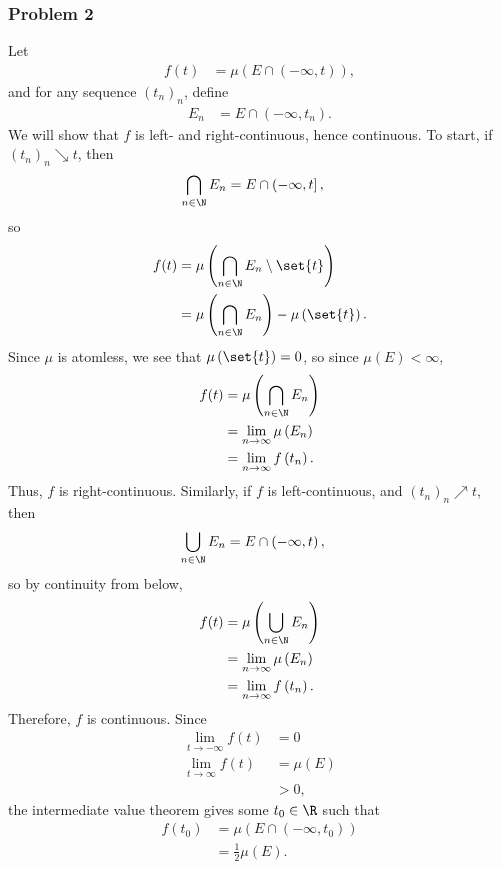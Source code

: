 \documentclass[10pt]{mypackage}
\begin{document}
\subsubsection{Problem 2}%
Let
\begin{align*}
  f(t) &= \mu\left( E\cap \left( -\infty,t \right) \right),
\end{align*}
and for any sequence $\left( t_n \right)_n$, define
\begin{align*}
  E_n &= E\cap \left( -\infty,t_n \right).
\end{align*}
We will show that $f$ is left- and right-continuous, hence continuous. To start, if $\left( t_n \right)_n\searrow t$, then
\begin{align*}
  \bigcap_{n\in \N} E_n &= E\cap \left( -\infty,t \right],
\end{align*}
so
\begin{align*}
  f(t) &= \mu\left( \bigcap_{n\in \N} E_n\setminus \set{t} \right)\\
       &= \mu\left( \bigcap_{n\in \N} E_n \right) -\mu\left( \set{t} \right).
\end{align*}
Since $\mu$ is atomless, we see that $\mu\left( \set{t} \right) = 0$, so since $\mu\left( E \right) < \infty$,
\begin{align*}
  f(t) &= \mu\left( \bigcap_{n\in\N} E_n \right)\\
       &= \lim_{n\rightarrow\infty} \mu\left( E_n \right)\\
       &= \lim_{n\rightarrow\infty} f\left( t_n \right).
\end{align*}
Thus, $f$ is right-continuous. Similarly, if $f$ is left-continuous, and $\left( t_n \right)_n \nearrow t$, then
\begin{align*}
  \bigcup_{n\in \N} E_n &= E\cap \left( -\infty,t \right),
\end{align*}
so by continuity from below,
\begin{align*}
  f(t) &= \mu\left( \bigcup_{n\in\N} E_n \right)\\
       &= \lim_{n\rightarrow\infty} \mu\left( E_n \right)\\
       &= \lim_{n\rightarrow\infty} f\left( t_n \right).
\end{align*}
Therefore, $f$ is continuous. Since
\begin{align*}
  \lim_{t\rightarrow -\infty} f(t) &= 0\\
  \lim_{t\rightarrow\infty} f(t) &= \mu\left( E \right)\\
                                 &> 0,
\end{align*}
the intermediate value theorem gives some $t_0\in \R$ such that
\begin{align*}
  f\left(t_0\right) &= \mu\left( E\cap \left( -\infty,t_0 \right) \right)\\
                    &= \frac{1}{2}\mu\left( E \right).
\end{align*}
\end{document}
